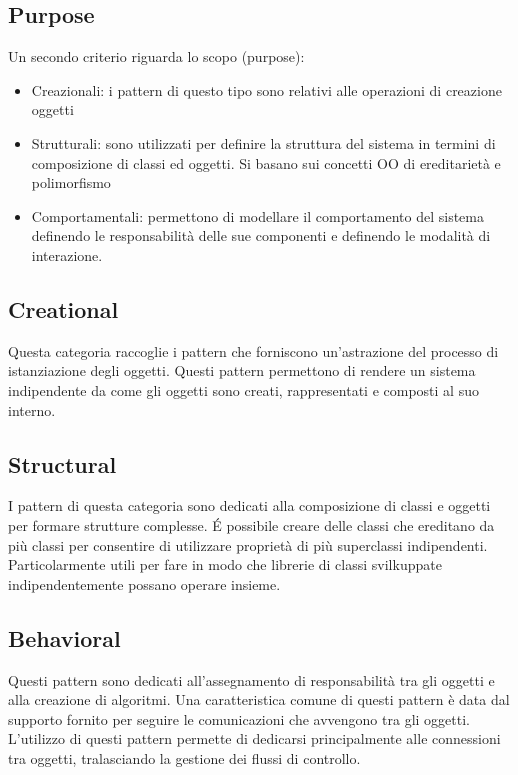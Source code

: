 \subsection*{Purpose}
Un secondo criterio riguarda lo scopo (purpose):
\begin{itemize}
    \item Creazionali: i pattern di questo tipo sono relativi alle operazioni di creazione oggetti
    \item Strutturali: sono utilizzati per definire la struttura del sistema in termini
    di composizione di classi ed oggetti. Si basano sui concetti OO di ereditarietà e polimorfismo
    \item Comportamentali: permettono di modellare il comportamento del sistema definendo le
    responsabilità delle sue componenti e definendo le modalità di interazione.
\end{itemize}
\subsection{Creational}
Questa categoria raccoglie i pattern che forniscono un'astrazione del processo di
istanziazione degli oggetti. Questi pattern permettono di rendere un sistema
indipendente da come gli oggetti sono creati, rappresentati e composti al suo interno.
\subsection{Structural}
I pattern di questa categoria sono dedicati alla composizione di classi e oggetti per formare
strutture complesse. \'E possibile creare delle classi che ereditano da più classi per
consentire di utilizzare proprietà di più superclassi indipendenti.\\
Particolarmente utili per fare in modo che librerie di classi svilkuppate indipendentemente possano
operare insieme.
\subsection{Behavioral}
Questi pattern sono dedicati all'assegnamento di responsabilità tra gli oggetti e alla
creazione di algoritmi. Una caratteristica comune di questi pattern è data dal supporto
fornito per seguire le comunicazioni che avvengono tra gli oggetti.\\
L'utilizzo di questi pattern permette di dedicarsi principalmente alle connessioni tra
oggetti, tralasciando la gestione dei flussi di controllo.
